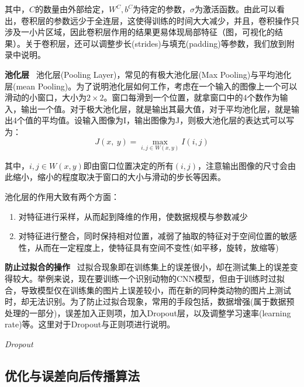 其中，$C$的数量由外部给定，$W^C,b^C$为待定的参数，$\sigma$为激活函数。由此可以看出，卷积层的参数远少于全连层，这使得训练的时间大大减少，并且，卷积操作只涉及一小片区域，因此卷积层作用的结果更易体现局部特征（图，可视化的结果）。关于卷积层，还可以调整步长(strides)与填充(padding)等参数，我们放到附录中说明。

\textbf{池化层} \ 池化层(Pooling Layer)，常见的有极大池化层(Max Pooling)与平均池化层(mean Pooling)。为了说明池化层如何工作，考虑在一个输入的图像上一个可以滑动的小窗口，大小为$2 \times 2$。窗口每滑到一个位置，就拿窗口中的4个数作为输入，输出一个值。对于极大池化层，就是输出其最大值，对于平均池化层，就是输出4个值的平均值。设输入图像为I，输出图像为J，则极大池化层的表达式可以写为：
\[
	J(x,\ y) = \max_{i,j \in W(x,y)}I(i,j)
\]

其中，$i,j \in W(x,y)$即由窗口位置决定的所有$(i,j)$，注意输出图像的尺寸会由此缩小，缩小的程度取决于窗口的大小与滑动的步长等因素。

池化层的作用大致有两个方面：
\begin{enumerate}
	\item 对特征进行采样，从而起到降维的作用，使数据规模与参数减少
	\item 对特征进行整合，同时保持相对位置，减弱了抽取的特征对于空间位置的敏感性，从而在一定程度上，使特征具有空间不变性(如平移，旋转，放缩等)
\end{enumerate}

\textbf{防止过拟合的操作} \ 过拟合现象即在训练集上的误差很小，却在测试集上的误差变得较大。举例来说，现在要训练一个识别动物的CNN模型，但由于训练时过拟合，导致模型仅在训练集的图片上误差较小，而在新的同种类动物的图片上测试时，却无法识别。为了防止过拟合现象，常用的手段包括，数据增强(属于数据预处理的一部分)，误差加入正则项，加入Dropout层，以及调整学习速率(learning rate)等。这里对于Dropout与正则项进行说明。

\emph{Dropout} \ 

\subsection{优化与误差向后传播算法}